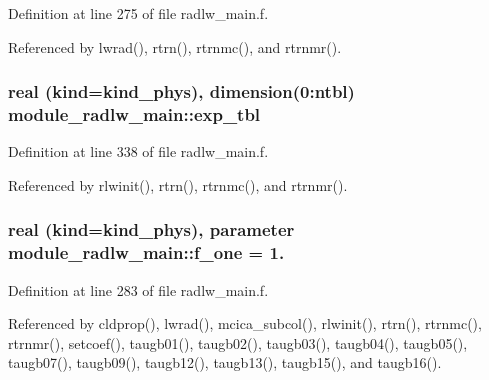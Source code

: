 Definition at line 275 of file radlw\+\_\+main.\+f.



Referenced by lwrad(), rtrn(), rtrnmc(), and rtrnmr().

\subsubsection[{\texorpdfstring{exp\+\_\+tbl}{exp_tbl}}]{\setlength{\rightskip}{0pt plus 5cm}real (kind=kind\+\_\+phys), dimension(0\+:ntbl) module\+\_\+radlw\+\_\+main\+::exp\+\_\+tbl\hspace{0.3cm}{\ttfamily [private]}}\hypertarget{group__module__radlw__main_gac2f240a927351a68fc9063321a307891}{}\label{group__module__radlw__main_gac2f240a927351a68fc9063321a307891}


Definition at line 338 of file radlw\+\_\+main.\+f.



Referenced by rlwinit(), rtrn(), rtrnmc(), and rtrnmr().

\subsubsection[{\texorpdfstring{f\+\_\+one}{f_one}}]{\setlength{\rightskip}{0pt plus 5cm}real (kind=kind\+\_\+phys), parameter module\+\_\+radlw\+\_\+main\+::f\+\_\+one = 1.\hspace{0.3cm}{\ttfamily [private]}}\hypertarget{group__module__radlw__main_ga518605a1451822f1888c6c7e85e07328}{}\label{group__module__radlw__main_ga518605a1451822f1888c6c7e85e07328}


Definition at line 283 of file radlw\+\_\+main.\+f.



Referenced by cldprop(), lwrad(), mcica\+\_\+subcol(), rlwinit(), rtrn(), rtrnmc(), rtrnmr(), setcoef(), taugb01(), taugb02(), taugb03(), taugb04(), taugb05(), taugb07(), taugb09(), taugb12(), taugb13(), taugb15(), and taugb16().

